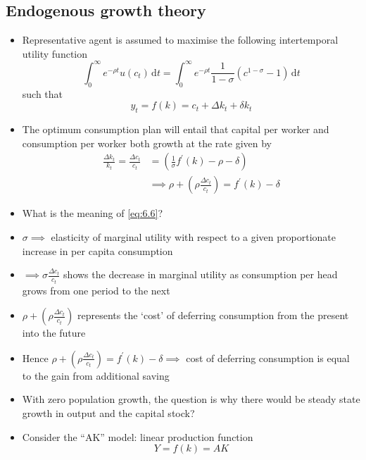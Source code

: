 \documentclass{article}
\begin{document}
\subsection{Endogenous growth theory}
\begin{itemize}
	\item Representative agent is assumed to maximise the following intertemporal utility function
	\begin{equation}
		\int_{0}^{\infty} e^{-\rho t} u(c_t) \,\mathrm{d}t = \int_{0}^{\infty} e^{-\rho t} \frac{1}{1-\sigma}(c^{1-\sigma} - 1) \,\mathrm{d}t
	\end{equation}
	such that
	\begin{equation}
		y_t = f(k) = c_t + \Delta k_t + \delta k_t
	\end{equation}
	\item The optimum consumption plan will entail that capital per worker and consumption per worker both growth at the rate given by 
	\begin{align}
		\frac{\Delta k_t}{k_t} = \frac{\Delta c_t}{c_t} &= (\frac{1}{\sigma}f^\prime(k) -\rho - \delta) \label{eq:6.5}\\
		&\implies \rho + \left( \rho \frac{\Delta c_t}{c_t} \right) = f^\prime(k) -\delta \label{eq:6.6}
	\end{align}
	\item What is the meaning of \cref{eq:6.6}?
	\item \( \sigma \implies \) elasticity of marginal utility with respect to a given proportionate increase in per capita consumption
	\item \( \implies \sigma \frac{\Delta c_t}{c_t} \) shows the decrease in marginal utility as consumption per head grows from one period to the next
	\item \( \rho + \left( \rho \frac{\Delta c_t}{c_t} \right) \) represents the `cost' of deferring consumption from the present into the future
	\item Hence \( \rho + \left( \rho \frac{\Delta c_t}{c_t} \right) = f^\prime(k) -\delta \implies \) cost of deferring consumption is equal to the gain from additional saving
	\item  With zero population growth, the question is why there would be steady state growth in output and the capital stock?
	\item Consider the ``AK'' model: linear production function
	\begin{equation}
		Y = f(k) = AK \label{eq:6.7}
	\end{equation}

\end{itemize}
\end{document}
